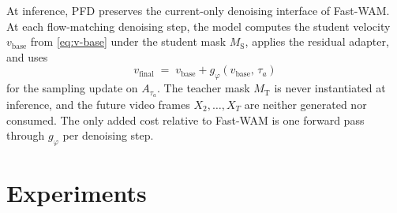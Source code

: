 \documentclass{article}
\begin{document}
At inference, PFD preserves the current-only denoising interface of Fast-WAM. At each flow-matching denoising step, the model computes the student velocity $v_\mathrm{base}$ from \eqref{eq:v-base} under the student mask $M_\mathrm{S}$, applies the residual adapter, and uses
\[
v_\mathrm{final} \;=\; v_\mathrm{base} + g_\varphi(v_\mathrm{base},\, \tau_a)
\]
for the sampling update on $A_{\tau_a}$. The teacher mask $M_\mathrm{T}$ is never instantiated at inference, and the future video frames $X_2, \ldots, X_T$ are neither generated nor consumed. The only added cost relative to Fast-WAM is one forward pass through $g_\varphi$ per denoising step.

%

\section{Experiments}
\label{sec:experiments}
\end{document}
